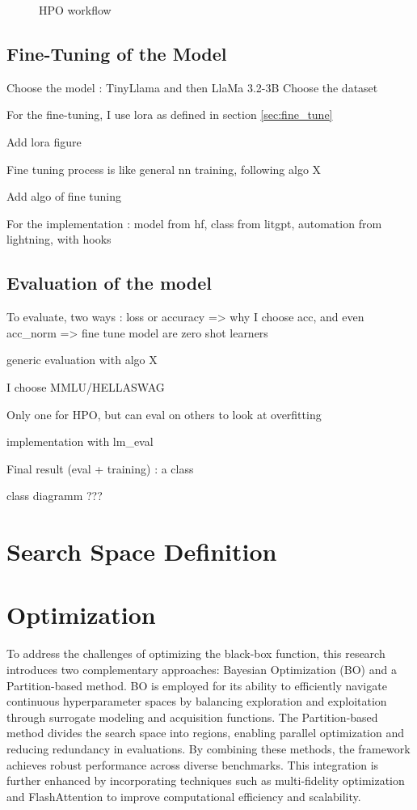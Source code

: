 \begin{figure}
    \centering
    
    \caption{HPO workflow}
    \label{fig:hpo_workflow}
\end{figure}

\subsection{Fine-Tuning of the Model}
Choose the model : TinyLlama and then LlaMa 3.2-3B
Choose the dataset

For the fine-tuning, I use \acrshort{lora} as defined in section \ref{sec:fine_tune}

Add lora figure

Fine tuning process is like general nn training, following algo X

Add algo of fine tuning

For the implementation : model from hf, class from litgpt, automation from lightning, with hooks

\subsection{Evaluation of the model}

To evaluate, two ways : loss or accuracy => why I choose acc, and even acc\_norm
=> fine tune model are zero shot learners

generic evaluation with algo X

I choose MMLU/HELLASWAG

Only one for HPO, but can eval on others to look at overfitting

implementation with lm\_eval

Final result (eval + training) : a class 

class diagramm ???

\section{Search Space Definition}
\label{search space}



\section{Optimization}
\label{sec:opt}
To address the challenges of optimizing the black-box function, this research introduces two complementary approaches: Bayesian Optimization (BO) and a Partition-based method. BO is employed for its ability to efficiently navigate continuous hyperparameter spaces by balancing exploration and exploitation through surrogate modeling and acquisition functions. The Partition-based method divides the search space into regions, enabling parallel optimization and reducing redundancy in evaluations. By combining these methods, the framework achieves robust performance across diverse benchmarks. This integration is further enhanced by incorporating techniques such as multi-fidelity optimization and FlashAttention to improve computational efficiency and scalability.

